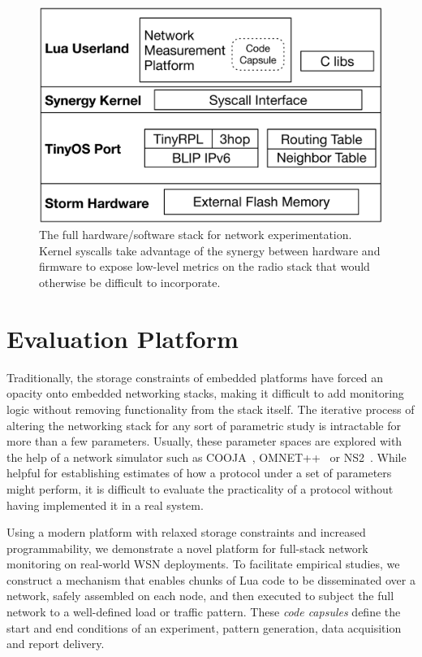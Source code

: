 \begin{figure}[t]
\centering
\includegraphics[width=.9\linewidth]{figs/NodeStack}
\caption{The full hardware/software stack for network experimentation. Kernel syscalls take advantage of the synergy between hardware and firmware to expose low-level metrics on the radio stack that would otherwise be difficult to incorporate.}
\label{fig:nodestack}
\end{figure}

\section{Evaluation Platform}



Traditionally, the storage constraints of embedded platforms have forced an opacity onto embedded networking stacks, making it difficult to add monitoring logic without removing functionality from the stack itself.
The iterative process of altering the networking stack for any sort of parametric study is intractable for more than a few parameters.
Usually, these parameter spaces are explored with the help of a network simulator such as COOJA~\cite{cooja}, OMNET++~\cite{omnet++} or NS2~\cite{ns2}.
While helpful for establishing estimates of how a protocol under a set of parameters might perform, it is difficult to evaluate the practicality of a protocol without having implemented it in a real system.

Using a modern platform with relaxed storage constraints and increased programmability, we demonstrate a novel platform for full-stack network monitoring on real-world WSN deployments.
To facilitate empirical studies, we construct a mechanism that enables chunks of Lua code to be disseminated over a network, safely assembled on each node, and then executed to subject the full network to a well-defined load or traffic pattern.
These \emph{code capsules} define the start and end conditions of an experiment, pattern generation, data acquisition and report delivery.

